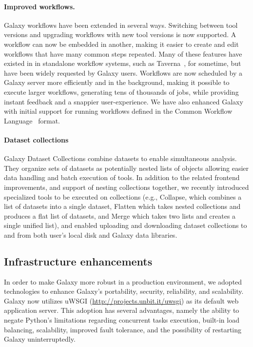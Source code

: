 \paragraph*{Improved workflows.}
Galaxy workflows have been extended in several ways. Switching between tool versions and upgrading workflows with new tool versions is now supported. A workflow can now be embedded in another, making it easier to create and edit workflows that have many common steps repeated. Many of these features have existed in in standalone workflow systems, such as Taverna~\cite{wolstencroft2013taverna}, for sometime, but have been widely requested by Galaxy users. Workflows are now scheduled by a Galaxy server more efficiently and in the background, making it possible to execute larger workflows, generating tens of thousands of jobs, while providing instant feedback and a snappier user-experience. We have also enhanced Galaxy with initial support for running workflows defined in the Common Workflow Language~\cite{amstutz2016common} format.

\paragraph*{Dataset collections}
Galaxy Dataset Collections combine datasets to enable simultaneous analysis. They organize sets of datasets as potentially nested lists of objects allowing easier data handling and batch execution of tools. In addition to the related frontend improvements, and support of nesting collections together, we recently introduced specialized tools to be executed on collections (e.g., Collapse, which combines a list of datasets into a single dataset, Flatten which takes nested collections and produces a flat list of datasets, and Merge which takes two lists and creates a single unified list), and enabled uploading and downloading dataset collections to and from both user’s local disk and Galaxy data libraries.

\subsection*{Infrastructure enhancements}
In order to make Galaxy more robust in a production environment, we adopted technologies to enhance Galaxy’s portability, security, reliability, and scalability. Galaxy now utilizes uWSGI (\url{http://projects.unbit.it/uwsgi}) as its default web application server. This adoption has several advantages, namely the ability to negate Python’s limitations regarding concurrent tasks execution, built-in load balancing, scalability, improved fault tolerance, and the possibility of restarting Galaxy uninterruptedly.

